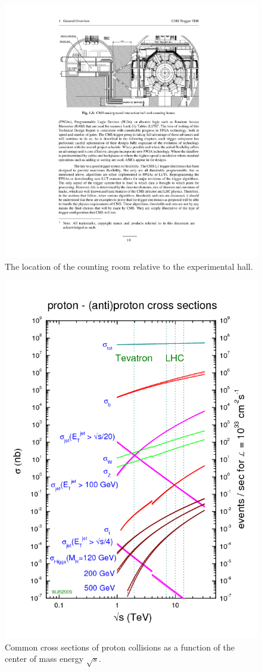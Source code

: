 \begin{figure}
\begin{center}
\includegraphics[width=.95\textwidth]{pics/counting_room}
\caption{The location of the counting room relative to the experimental hall.}
\end{center}
\label{fig:counting_room}
\end{figure}

\begin{figure}
\begin{center}
\includegraphics[width=.6\textwidth]{figures/exp_proj/pdf_xsec.png}
\end{center}
\caption{Common cross sections of proton collisions as a function of the center of mass energy $\sqrt{s}$.\label{fig:pdfxsec}}
\end{figure}

